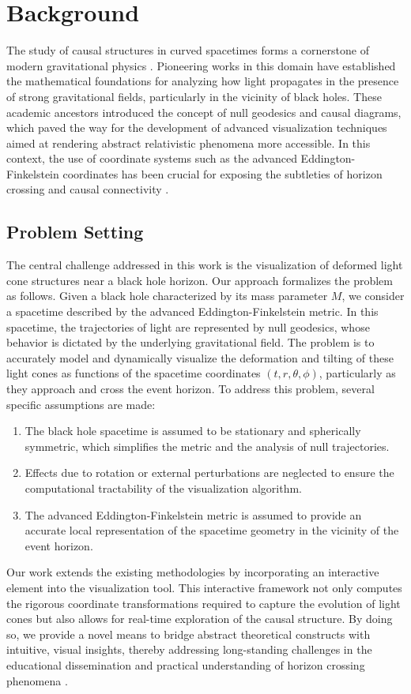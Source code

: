 \documentclass{article}
\begin{document}
\section{Background}  The study of causal structures in curved spacetimes forms a cornerstone of modern gravitational physics \cite{Reference1,Reference2}. Pioneering works in this domain have established the mathematical foundations for analyzing how light propagates in the presence of strong gravitational fields, particularly in the vicinity of black holes. These academic ancestors introduced the concept of null geodesics and causal diagrams, which paved the way for the development of advanced visualization techniques aimed at rendering abstract relativistic phenomena more accessible. In this context, the use of coordinate systems such as the advanced Eddington-Finkelstein coordinates has been crucial for exposing the subtleties of horizon crossing and causal connectivity \cite{Reference3}.  \subsection{Problem Setting}  The central challenge addressed in this work is the visualization of deformed light cone structures near a black hole horizon. Our approach formalizes the problem as follows. Given a black hole characterized by its mass parameter $M$, we consider a spacetime described by the advanced Eddington-Finkelstein metric. In this spacetime, the trajectories of light are represented by null geodesics, whose behavior is dictated by the underlying gravitational field. The problem is to accurately model and dynamically visualize the deformation and tilting of these light cones as functions of the spacetime coordinates $(t, r, \theta, \phi)$, particularly as they approach and cross the event horizon.  To address this problem, several specific assumptions are made: \begin{enumerate}   \item The black hole spacetime is assumed to be stationary and spherically symmetric, which simplifies the metric and the analysis of null trajectories.   \item Effects due to rotation or external perturbations are neglected to ensure the computational tractability of the visualization algorithm.   \item The advanced Eddington-Finkelstein metric is assumed to provide an accurate local representation of the spacetime geometry in the vicinity of the event horizon. \end{enumerate}  Our work extends the existing methodologies by incorporating an interactive element into the visualization tool. This interactive framework not only computes the rigorous coordinate transformations required to capture the evolution of light cones but also allows for real-time exploration of the causal structure. By doing so, we provide a novel means to bridge abstract theoretical constructs with intuitive, visual insights, thereby addressing long-standing challenges in the educational dissemination and practical understanding of horizon crossing phenomena \cite{Reference4}.
\end{document}
